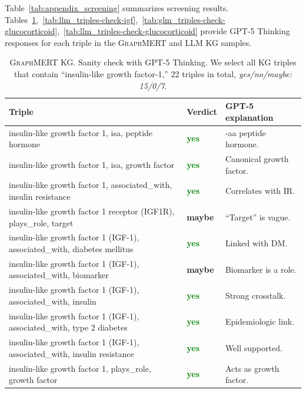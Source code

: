 \documentclass[10pt]{article}
\newcommand{\ours}{\textsc{GraphMERT}\xspace}
\begin{document}
\begin{appendices}
Table~\ref{tab:appendix_screening} summarizes screening results. Tables~\ref{tab:glm_triples-check-igf},~\ref{tab:llm_triples-check-igf},~\ref{tab:glm_triples-check-glucocorticoid},~\ref{tab:llm_triples-check-glucocorticoid} provide GPT-5 Thinking responses for each triple in the \ours and LLM KG samples.


\begin{table}[t]
\centering
\caption{\ours KG. Sanity check with GPT-5 Thinking. We select all KG triples that contain ``insulin-like growth factor-1,'' 22 triples in total, \emph{yes/no/maybe: 15/0/7}.}
\label{tab:glm_triples-check-igf}
\begin{tabularx}{\linewidth}{
  >{\hsize=1.3\hsize\raggedright\arraybackslash}X  %
  p{3em}                                           %
  >{\hsize=0.7\hsize\raggedright\arraybackslash}X  %
}
\toprule
\rowcolor{gray!30}
\textbf{Triple} & \textbf{Verdict} & \textbf{GPT-5 explanation} \\
\midrule
insulin-like growth factor 1, isa, peptide hormone & \textcolor{Green}{\bf yes} & 70-aa peptide hormone. \\
insulin-like growth factor 1, isa, growth factor & \textcolor{Green}{\bf yes} & Canonical growth factor. \\
insulin-like growth factor 1, associated\_with, insulin resistance & \textcolor{Green}{\bf yes} & Correlates with IR. \\
insulin-like growth factor 1 receptor (IGF1R), plays\_role, target & \textcolor{YellowOrange}{\bf maybe} & ``Target'' is vague. \\
insulin-like growth factor 1 (IGF-1), associated\_with, diabetes mellitus & \textcolor{Green}{\bf yes} & Linked with DM. \\
insulin-like growth factor 1 (IGF-1), associated\_with, biomarker & \textcolor{YellowOrange}{\bf maybe} & Biomarker is a role. \\
insulin-like growth factor 1 (IGF-1), associated\_with, insulin & \textcolor{Green}{\bf yes} & Strong crosstalk. \\
insulin-like growth factor 1 (IGF-1), associated\_with, type 2 diabetes & \textcolor{Green}{\bf yes} & Epidemiologic link. \\
insulin-like growth factor 1 (IGF-1), associated\_with, insulin resistance & \textcolor{Green}{\bf yes} & Well supported. \\
insulin-like growth factor 1, plays\_role, growth factor & \textcolor{Green}{\bf yes} & Acts as growth factor. \\

\end{tabularx}
\end{table}
\end{appendices}
\end{document}
